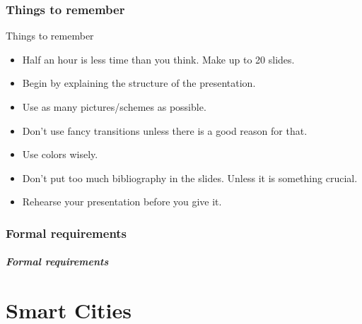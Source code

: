 \documentclass{beamer}
\begin{document}
\section[Things to remember]{Things to remember}
\begin{frame}{Things to remember}
    \begin{itemize}
     \item Half an hour is less time than you think. \alert{Make up to 20 slides}.
     \item Begin by explaining the structure of the presentation.
     \item \alert{Use as many pictures/schemes as possible}.
     \item Don't use fancy transitions unless there is a good reason for that.
     \item Use colors wisely.
     \item Don't put too much bibliography in the slides. Unless it is something crucial.
     \item Rehearse your presentation before you give it.
    \end{itemize}
\end{frame}
    
\section[Formal requirements]{Formal requirements}
\begin{frame}
        \frametitle{Formal requirements}
\end{frame}
\part{Smart Cities}
\end{document}
